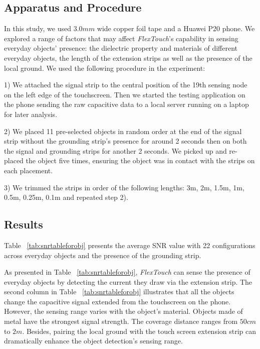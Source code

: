 \subsection{Apparatus and Procedure}
In this study, we used $3.0 mm$ wide copper foil tape and a Huawei P20 phone. We explored a range of factors that may affect \textit{FlexTouch}'s capability in sensing everyday objects' presence: the dielectric property and materials of different everyday objects, the length of the extension strips as well as the presence of the local ground. We used the following procedure in the experiment:

1) We attached the signal strip to the central position of the 19th sensing node on the left edge of the touchscreen. Then we started the testing application on the phone sending the raw capacitive data to a local server running on a laptop for later analysis.

2) We placed 11 pre-selected objects in random order at the end of the signal strip without the grounding strip's presence for around 2 seconds then on both the signal and grounding strips for another 2 seconds. We picked up and re-placed the object five times, ensuring the object was in contact with the strips on each placement.

3) We trimmed the strips in order of the following lengths: 3m, 2m, 1.5m, 1m, 0.5m, 0.25m, 0.1m and repeated step 2).

\subsection{Results}

Table ~\ref{tab:snrtableforobj} presents the average SNR value with 22 configurations across everyday objects and the presence of the grounding strip.

As presented in Table ~\ref{tab:snrtableforobj}, \textit{FlexTouch} can sense the presence of everyday objects by detecting the current they draw via the extension strip. The second column in Table ~\ref{tab:snrtableforobj} illustrates that all the objects change the capacitive signal extended from the touchscreen on the phone. However, the sensing range varies with the object's material. Objects made of metal have the strongest signal strength. The coverage distance ranges from $50 cm$ to $2 m$. Besides, pairing the local ground with the touch screen extension strip can dramatically enhance the object detection's sensing range. 


